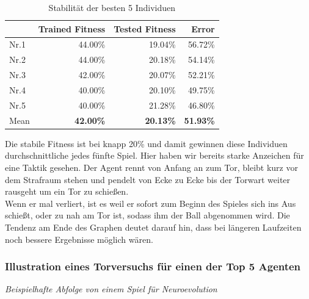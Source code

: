                 \begin{table}[H]
                    \begin{center}
                    \begin{tabular}{ |l|r|r|r| } 
                        \hline
                        \hfill & Trained Fitness   & Tested Fitness  &          Error    \\ \hline
                          Nr.1 &          44.00\%  &         19.04\% &          56.72\%  \\  
                          Nr.2 &          44.00\%  &         20.18\% &          54.14\%  \\  
                          Nr.3 &          42.00\%  &         20.07\% &          52.21\%  \\ 
                          Nr.4 &          40.00\%  &         20.10\% &          49.75\%  \\ 
                          Nr.5 &          40.00\%  &         21.28\% &          46.80\%  \\ \hline
                          Mean &  \textbf{42.00\%} & \textbf{20.13\%} & \textbf{51.93\%}  \\ \hline
                    \end{tabular}
                    \end{center}
                    \caption{Stabilität der besten 5 Individuen \label{fig:neuroevotable}}
                \end{table}

                \noindent
                Die stabile Fitness ist bei knapp 20\% und damit gewinnen diese Individuen durchschnittliche jedes fünfte Spiel. Hier haben wir bereits starke Anzeichen für eine Taktik gesehen. Der Agent rennt von Anfang an zum Tor, bleibt kurz vor dem Strafraum stehen und pendelt von Ecke zu Ecke bis der Torwart weiter rausgeht um ein Tor zu schießen.\\

                \noindent
                Wenn er mal verliert, ist es weil er sofort zum Beginn des Spieles sich ins Aus schießt, oder zu nah am Tor ist, sodass ihm der Ball abgenommen wird. Die Tendenz am Ende des Graphen deutet darauf hin, dass bei längeren Laufzeiten noch bessere Ergebnisse möglich wären.%
\newpage
                \subsubsection*{Illustration eines Torversuchs für einen der Top 5 Agenten}
                \begin{center} \textit{Beispielhafte Abfolge von einem Spiel für Neuroevolution} \end{center}
\newpage
